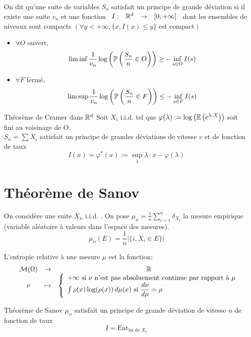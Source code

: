 \documentclass[]{report}
\begin{document}
    \begin{df}{}{}
        On dit qu'une suite de variables $S_n$ satisfait un principe de grande déviation si il existe une suite $v_n$ et une fonction $\begin{array}{ccccc} I : & \mathbb{R}^d & \to & [0,+\infty] \end{array}$ dont les ensembles de niveaux sont compacts $(\forall y<+\infty,\{x, I(x)\le y\}\text{ est compact})$
        \begin{itemize}
            \item $\forall O$ ouvert,
            \[\liminf \frac{1}{v_n} \log \left( \mathbb{P}\left(\frac{S_n}{n}\in O\right)\right)\ge -\inf_{s\in O} I(s)\]
            \item $\forall F$ fermé,
            \[\limsup \frac{1}{v_n} \log \left( \mathbb{P}\left(\frac{S_n}{n}\in F\right)\right)\le -\inf_{s\in F} I(s)\]
        \end{itemize}
    \end{df}

    \begin{tm}{Théorème de Cramer dans $\mathbb{R}^d$}{}
        Soit $X_i$ i.i.d. tel que $\varphi(\lambda):= \log \left(\mathbb{E}\left(e^{\lambda\cdot X}\right)\right)$ soit fini au voisinage de $O$.\\
        $S_n=\sum X_i$ satisfait un principe de grandes déviations de vitesse $v$ et de fonction de taux
        \[I(x)=\varphi^*(x):=\sup_\lambda \lambda\cdot x-\varphi(\lambda)\]
    \end{tm}

    \section{Théorème de Sanov}

    On considère une suite $X_n$ i.i.d. . On pose $\displaystyle{ \mu_n=\frac{1}{n} \sum_{i=1}^{n}\delta_{X_i}}$ la mesure empirique (variable aléatoire à valeurs dans l'espace des mesures).
    \[\mu_n(E)=\frac{1}{n} \left|\{i,X_i\in E\}\right|\]

    \begin{df}{}{}
        L'entropie relative à une mesure $\mu$ est la fonction:
        \[\begin{array}{ccccc} & \mathcal{M}(\Omega) & \to & \mathbb{R} \\ & \nu & \mapsto & \left\{\begin{array}{ll} +\infty\text{ si $\nu$ n'est pas absoluement continue par rapport à $\mu$}\\ \int \rho(x)\log(\rho(x))\, d\mu(x)\text{ si $\dfrac{d\nu}{d\mu}=\rho$} \end{array} \right. \end{array}\]
    \end{df}

    \begin{tm}{Théorème de Sanov}{}
        $\mu_n$ satisfait un principe de grande déviation de vitesse $n$ de fonction de taux
        \[I=\text{Ent}_{\text{loi de $X_1$}}\]
    \end{tm}
\end{document}
